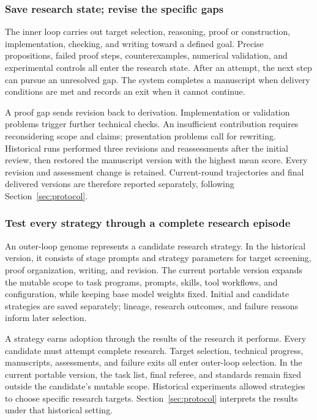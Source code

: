 \subsubsection{Save research state; revise the specific gaps}
The inner loop carries out target selection, reasoning, proof or construction, implementation, checking, and writing toward a defined goal. Precise propositions, failed proof steps, counterexamples, numerical validation, and experimental controls all enter the research state. After an attempt, the next step can pursue an unresolved gap. The system completes a manuscript when delivery conditions are met and records an exit when it cannot continue.

A proof gap sends revision back to derivation. Implementation or validation problems trigger further technical checks. An insufficient contribution requires reconsidering scope and claims; presentation problems call for rewriting. Historical runs performed three revisions and reassessments after the initial review, then restored the manuscript version with the highest mean score. Every revision and assessment change is retained. Current-round trajectories and final delivered versions are therefore reported separately, following Section~\ref{sec:protocol}.

\subsubsection{Test every strategy through a complete research episode}
An outer-loop genome represents a candidate research strategy. In the historical version, it consists of stage prompts and strategy parameters for target screening, proof organization, writing, and revision. The current portable version expands the mutable scope to task programs, prompts, skills, tool workflows, and configuration, while keeping base model weights fixed. Initial and candidate strategies are saved separately; lineage, research outcomes, and failure reasons inform later selection.

A strategy earns adoption through the results of the research it performs. Every candidate must attempt complete research. Target selection, technical progress, manuscripts, assessments, and failure exits all enter outer-loop selection. In the current portable version, the task list, final referee, and standards remain fixed outside the candidate's mutable scope. Historical experiments allowed strategies to choose specific research targets. Section~\ref{sec:protocol} interprets the results under that historical setting.

